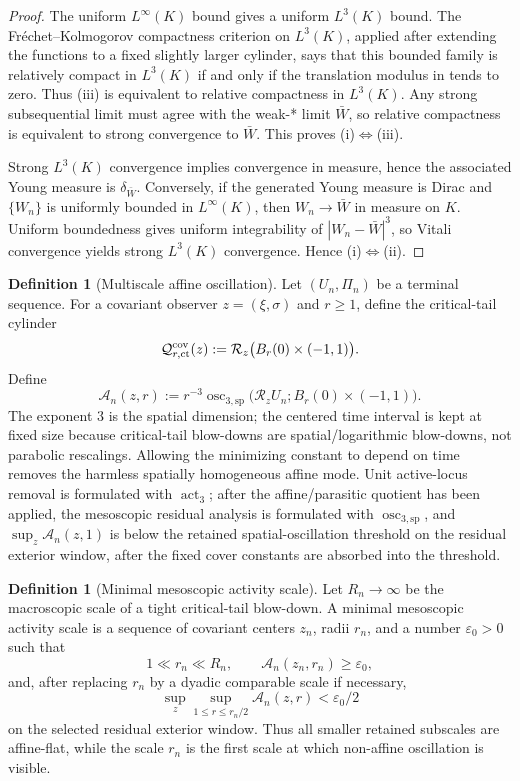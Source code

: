 \documentclass[11pt]{amsart}
\numberwithin{equation}{section}
\theoremstyle{plain}
\theoremstyle{definition}
\newtheorem{definition}[theorem]{Definition}
\theoremstyle{remark}
\newcommand{\calR}{\mathcal R}
\newcommand{\oscsp}{\operatorname{osc}_{3,\mathrm{sp}}}
\newcommand{\actthree}{\operatorname{act}_3}
\begin{document}
\begin{proof}
The uniform \(L^\infty(K)\) bound gives a uniform \(L^3(K)\) bound.  The
Fr\'echet--Kolmogorov compactness criterion on \(L^3(K)\), applied after
extending the functions to a fixed slightly larger cylinder, says that this
bounded family is relatively compact in \(L^3(K)\) if and only if the
translation modulus in  tends to zero.  Thus
\textup{(iii)} is equivalent to relative compactness in \(L^3(K)\).  Any strong
subsequential limit must agree with the weak-* limit \(\bar W\), so relative
compactness is equivalent to strong convergence to \(\bar W\).  This proves
\textup{(i)}\(\Leftrightarrow\)\textup{(iii)}.

Strong \(L^3(K)\) convergence implies convergence in measure, hence the
associated Young measure is \(\delta_{\bar W}\).  Conversely, if the generated
Young measure is Dirac and \(\{W_n\}\) is uniformly bounded in \(L^\infty(K)\),
then \(W_n\to\bar W\) in measure on \(K\).  Uniform boundedness gives uniform
integrability of \(|W_n-\bar W|^3\), so Vitali convergence yields strong
\(L^3(K)\) convergence.  Hence
\textup{(i)}\(\Leftrightarrow\)\textup{(ii)}.
\end{proof}

\begin{definition}[Multiscale affine oscillation]
\label{def:multiscale-affine-oscillation}
Let \((U_n,\Pi_n)\) be a terminal sequence.  For a covariant observer
\(z=(\xi,\sigma)\) and \(r\ge1\), define the critical-tail cylinder
\[
   \mathcal Q_{r,\mathrm{ct}}^{\rm cov}(z)
   :=
   \calR_z\bigl(B_r(0)\times(-1,1)\bigr).
\]
Define
\[
   \mathcal A_n(z,r)
   :=
   r^{-3}
   \oscsp\bigl(\calR_zU_n;B_r(0)\times(-1,1)\bigr).
\]
The exponent \(3\) is the spatial dimension; the centered time interval is kept
at fixed size because critical-tail blow-downs are spatial/logarithmic
blow-downs, not parabolic rescalings.  Allowing the minimizing constant to
depend on time removes the harmless spatially homogeneous affine mode.  Unit
active-locus removal is formulated with \(\actthree\); after the
affine/parasitic quotient has been applied, the mesoscopic residual analysis is
formulated with \(\oscsp\), and \(\sup_z\mathcal A_n(z,1)\) is below the retained
spatial-oscillation threshold on the residual exterior window, after the fixed
cover constants are absorbed into the threshold.
\end{definition}

\begin{definition}[Minimal mesoscopic activity scale]
\label{def:first-bad-mesoscopic-scale}
Let \(R_n\to\infty\) be the macroscopic scale of a tight critical-tail
blow-down.  A minimal mesoscopic activity scale is a sequence of covariant centers
\(z_n\), radii \(r_n\), and a number \(\varepsilon_0>0\) such that
\[
   1\ll r_n\ll R_n,
   \qquad
   \mathcal A_n(z_n,r_n)\ge\varepsilon_0,
\]
and, after replacing \(r_n\) by a dyadic comparable scale if necessary,
\[
   \sup_{z}\sup_{1\le r\le r_n/2}\mathcal A_n(z,r)
   <\varepsilon_0/2
\]
on the selected residual exterior window.  Thus all smaller retained
subscales are affine-flat, while the scale \(r_n\) is the first scale at which
non-affine oscillation is visible.
\end{definition}
\end{document}
